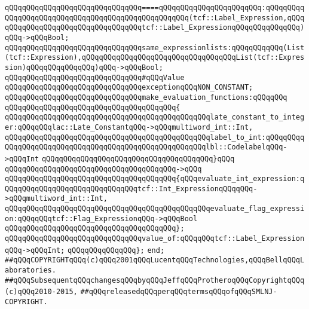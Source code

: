 \verb|qQQqqQQqqQQqqQQqqQQqqQQqqQQqqQQq====qQQqqQQqqQQqqQQqqQQqqQQq:qQQqqQQqqQQqqQQqqQQqqQQqqQQqqQQqqQQqqQQqqQQqqQQqqQQq(tcf::Label_Expression,qQQqqQQqqQQqqQQqqQQqqQQqqQQqqQQqqQQqtcf::Label_ExpressionqQQqqQQqqQQqqQQq)qQQq->qQQqBool;|\newline
\verb|qQQqqQQqqQQqqQQqqQQqqQQqqQQqqQQqsame_expressionlists:qQQqqQQqqQQq(List(tcf::Expression),qQQqqQQqqQQqqQQqqQQqqQQqqQQqqQQqqQQqList(tcf::Expression)qQQqqQQqqQQqqQQq)qQQq->qQQqBool;|\newline
\newline
\newline
\newline
\verb|qQQqqQQqqQQqqQQqqQQqqQQqqQQqqQQq#qQQqValue|\newline
\newline
\verb|qQQqqQQqqQQqqQQqqQQqqQQqqQQqqQQqexceptionqQQqNON_CONSTANT;|\newline
\newline
\verb|qQQqqQQqqQQqqQQqqQQqqQQqqQQqqQQqmake_evaluation_functions:qQQqqQQq|\newline
\verb|qQQqqQQqqQQqqQQqqQQqqQQqqQQqqQQqqQQqqQQq{|\newline
\verb|qQQqqQQqqQQqqQQqqQQqqQQqqQQqqQQqqQQqqQQqqQQqqQQqlate_constant_to_integer:qQQqqQQqlac::Late_ConstantqQQq->qQQqmultiword_int::Int,|\newline
\verb|qQQqqQQqqQQqqQQqqQQqqQQqqQQqqQQqqQQqqQQqqQQqqQQqlabel_to_int:qQQqqQQqqQQqqQQqqQQqqQQqqQQqqQQqqQQqqQQqqQQqqQQqqQQqqQQqlbl::CodelabelqQQq->qQQqInt|\newline
\verb|qQQqqQQqqQQqqQQqqQQqqQQqqQQqqQQqqQQqqQQq}qQQq|\newline
\verb|qQQqqQQqqQQqqQQqqQQqqQQqqQQqqQQqqQQqqQQq->qQQq|\newline
\verb|qQQqqQQqqQQqqQQqqQQqqQQqqQQqqQQqqQQqqQQq{qQQqevaluate_int_expression:qQQqqQQqqQQqqQQqqQQqqQQqqQQqqQQqtcf::Int_ExpressionqQQqqQQq->qQQqmultiword_int::Int,|\newline
\verb|qQQqqQQqqQQqqQQqqQQqqQQqqQQqqQQqqQQqqQQqqQQqqQQqevaluate_flag_expression:qQQqqQQqtcf::Flag_ExpressionqQQq->qQQqBool|\newline
\verb|qQQqqQQqqQQqqQQqqQQqqQQqqQQqqQQqqQQqqQQq};|\newline
\newline
\verb|qQQqqQQqqQQqqQQqqQQqqQQqqQQqqQQqvalue_of:qQQqqQQqtcf::Label_ExpressionqQQq->qQQqInt;|\newline
\verb|qQQqqQQqqQQqqQQq};|\newline
\verb|end;|\newline
\newline
\verb|##qQQqCOPYRIGHTqQQq(c)qQQq2001qQQqLucentqQQqTechnologies,qQQqBellqQQqLaboratories.|\newline
\verb|##qQQqSubsequentqQQqchangesqQQqbyqQQqJeffqQQqProtheroqQQqCopyrightqQQq(c)qQQq2010-2015,|\newline
\verb|##qQQqreleasedqQQqperqQQqtermsqQQqofqQQqSMLNJ-COPYRIGHT.|\newline

